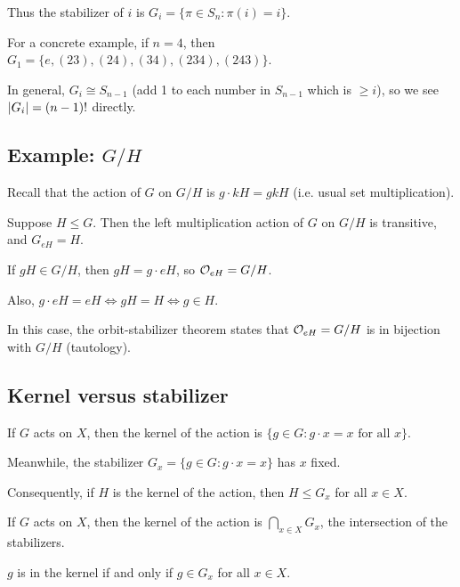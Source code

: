 \documentclass[12pt,letterpaper]{report}
\begin{document}
Thus the stabilizer of $i$ is $G_i = \{\pi \in S_n : \pi(i) = i\}$.

For a concrete example, if $n = 4$, then
$G_1 = \{e, (23), (24), (34), (234), (243)\}$.

In general, $G_i \cong S_{n - 1}$ (add 1 to each number in $S_{n - 1}$ which is $\geq i$), so
we see $\lvert G_i\rvert = (n - 1)!$ directly.

\pagebreak
\subsection[Example: G/H]{Example: $G/H$}

Recall that the action of $G$ on $G/H$ is $g \cdot kH = gkH$ (i.e. usual set multiplication).

\begin{prop}{}{}
  Suppose $H \leq G$.
  Then the left multiplication action of $G$ on $G/H$ is transitive, and $G_{eH} = H$.
\end{prop}

\begin{thmproof}
  If $gH \in G/H$, then $gH = g \cdot eH$, so $\mathcal{O}_{eH} = G/H$.

  Also, $g \cdot eH = eH \iff gH = H \iff g \in H$.
\end{thmproof}

In this case, the orbit-stabilizer theorem states that $\mathcal{O}_{eH} = G/H$ is in bijection with
$G/H$ (tautology).

\pagebreak
\subsection{Kernel versus stabilizer}

If $G$ acts on $X$, then the kernel of the action is
$\{g \in G : g \cdot x = x \text{ for all } x\}$.

Meanwhile, the stabilizer $G_x = \{g \in G : g \cdot x = x\}$ has $x$ fixed.

Consequently, if $H$ is the kernel of the action, then $H \leq G_x$ for all $x \in X$.

\begin{prop}{}{}
  If $G$ acts on $X$, then the kernel of the action is $\bigcap_{x \in X} G_x$, the intersection of
  the stabilizers.
\end{prop}

\begin{thmproof}
  $g$ is in the kernel if and only if $g \in G_x$ for all $x \in X$.
\end{thmproof}
\end{document}
